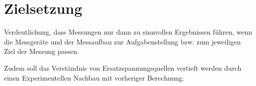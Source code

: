 \part{Zielsetzung}

Verdeutlichung, dass Messungen nur dann zu sinnvollen Ergebnissen führen, wenn die Messgeräte und der Messaufbau zur Aufgabenstellung bzw. zum jeweiligen Ziel der Messung passen.

Zudem soll das Verständnis von Ersatzspannungsquellen vertieft werden durch einen Experimentellen Nachbau mit vorheriger Berechnung.
